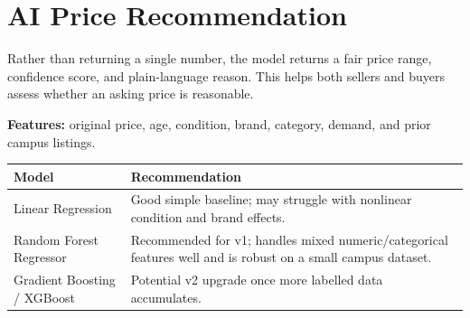 \documentclass[11pt,a4paper]{article}
\begin{document}
\section{AI Price Recommendation}

Rather than returning a single number, the model returns a fair price range, confidence score, and plain-language reason. This helps both sellers and buyers assess whether an asking price is reasonable.

\begin{center}
\end{center}

\textbf{Features:} original price, age, condition, brand, category, demand, and prior campus listings.

\begin{table}[H]
\centering
\begin{tabularx}{\textwidth}{P{0.28\textwidth}Y}
\toprule
\textbf{Model} & \textbf{Recommendation}\\
\midrule
Linear Regression & Good simple baseline; may struggle with nonlinear condition and brand effects.\\
Random Forest Regressor & Recommended for v1; handles mixed numeric/categorical features well and is robust on a small campus dataset.\\
Gradient Boosting / XGBoost & Potential v2 upgrade once more labelled data accumulates.\\
\bottomrule
\end{tabularx}
\end{table}
\end{document}
